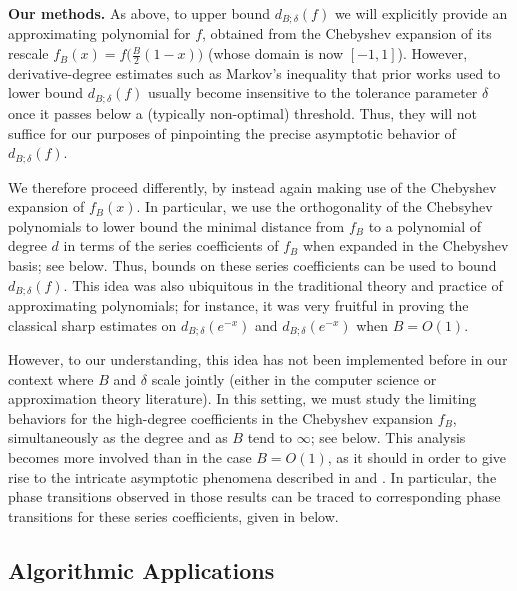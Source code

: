 \documentclass[10pt,a4paper]{article}
\theoremstyle{plain}\newtheorem{theorem}{Theorem}
\theoremstyle{definition}
\begin{document}
 \textbf{Our methods.} As above, to upper bound $d_{B; \delta} (f)$ we will explicitly provide an approximating polynomial for $f$, obtained from the Chebyshev expansion of its rescale $f_B (x) = f \big( \frac{B}{2} (1 - x) \big)$ (whose domain is now $[-1, 1]$). However, derivative-degree estimates such as Markov's inequality that prior works used to lower bound $d_{B; \delta} (f)$ usually become insensitive to the tolerance parameter $\delta$ once it passes below a (typically non-optimal) threshold. Thus, they will not suffice for our purposes of pinpointing the precise asymptotic behavior of $d_{B; \delta} (f)$.

We therefore proceed differently, by instead again making use of the Chebyshev expansion of $f_B (x)$. In particular, we use the orthogonality of the Chebsyhev polynomials to lower bound the minimal distance from $f_B$ to a polynomial of degree $d$ in terms of the series coefficients of $f_B$ when expanded in the Chebyshev basis; see  below. Thus, bounds on these series coefficients can be used to bound $d_{B; \delta} (f)$. This idea was also ubiquitous in the traditional theory and practice of approximating polynomials; for instance, it was very fruitful in proving the classical sharp estimates \cite[{Chapter 7.8 (22)}]{TAFRV} on $d_{B; \delta} (e^{-x})$ and $d_{B; \delta} (e^{-x})$ when $B = O(1)$. 

However, to our understanding, this idea has not been implemented before in our context where $B$ and $\delta$ scale jointly (either in the computer science or approximation theory literature). In this setting, we must study the limiting behaviors for the high-degree coefficients in the Chebyshev expansion $f_B$, simultaneously as the degree and as $B$ tend to $\infty$; see  below. This analysis becomes more involved than in the case $B = O(1)$, as it should in order to give rise to the intricate asymptotic phenomena described in  and . In particular, the phase transitions observed in those results can be traced to corresponding phase transitions for these series coefficients, given in  below. 



\subsection{Algorithmic Applications}

\label{Algorithm}
\end{document}
